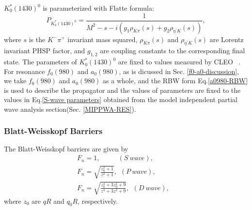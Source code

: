 {{        $K^{*}_{0}(1430)^{0}$ is parameterized with Flatte formula:
        \begin{equation}
            P_{K^{*}_{0}(1430)^{0}}= \frac{1}{M^{2} - s - i(g_{1}\rho_{K\pi}(s) + g_{2}\rho_{\eta^{'}K}(s))}, \label{Flatte}
        \end{equation}
        where $s$ is the $K^{-}\pi^{+}$ invariant mass squared,  $\rho_{K\pi}(s)$ and $\rho_{\eta^{'}K}(s)$ are Lorentz invariant PHSP factor, and   $g_{1,2}$ are coupling constants to the corresponding final state. The parameters of $K^{*}_{0}(1430)^{0}$ are fixed to values measured by CLEO ~\cite{CLEO-Flatte}. 
        For resonance $f_{0}(980)$ and $a_{0}(980)$, as is dicussed in Sec. \ref{f0-a0-discussion}, we take $f_{0}(980)$ and $a_{0}(980)$ as a whole, and the RBW form Eq.\ref{a0980-RBW} is used to describe the propagator and the values of parameters are fixed to the values in Eq.\ref{S-wave parameters} obtained from the model independent partial wave analysis section(Sec. \ref{MIPPWA-RES}).
    }

    \subsubsection{Blatt-Weisskopf Barriers}{
        The Blatt-Weisskopf barriers are given by 
        \begin{equation}
            \begin{array}{lr}
                F_{n} = 1,       \ \ \ \ \ \ \ \ \ \ \ \   (S\ wave), &\\
                F_{n} = \sqrt{\frac{z_{0}^{2}+1}{z^{2}+1}},      \ \     (P\ wave), &\\
                F_{n} = \sqrt{\frac{z_{0}^{4}+3z_{0}^{2}+9}{z^{4}+3z^{2}+9}},   \ \      (D\ wave), &
            \end{array}\label{Blatt-Weisskopf barrier} 
        \end{equation}
        where $z_{0}$ are $qR$ and $q_{0}R$, respectively. 
    }

}
